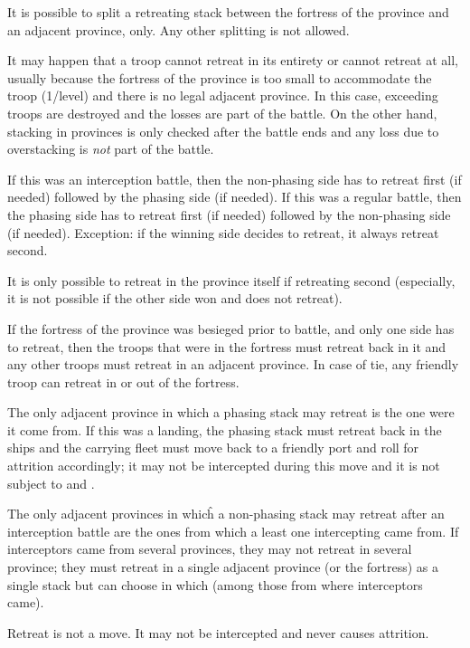 It is possible to split a retreating stack between the fortress of the
province and an adjacent province, only. Any other splitting is not allowed.

It may happen that a troop cannot retreat in its entirety or cannot retreat at
all, usually because the fortress of the province is too small to accommodate
the troop (1\LD/level) and there is no legal adjacent province. In this case,
exceeding troops are destroyed and the losses are part of the battle. On the
other hand, stacking in provinces is only checked after the battle ends and
any loss due to overstacking is \emph{not} part of the battle.

If this was an interception battle, then the non-phasing side has to retreat
first (if needed) followed by the phasing side (if needed). If this was a
regular battle, then the phasing side has to retreat first (if needed)
followed by the non-phasing side (if needed). Exception: if the winning side
decides to retreat, it always retreat second.

It is only possible to retreat in the province itself if retreating second
(especially, it is not possible if the other side won and does not retreat).

If the fortress of the province was besieged prior to battle, and only one
side has to retreat, then the troops that were in the fortress must retreat
back in it and any other troops must retreat in an adjacent province. In case
of tie, any friendly troop can retreat in or out of the fortress.

The only adjacent province in which a phasing stack may retreat is the one
were it come from. If this was a landing, the phasing stack must retreat back
in the ships and the carrying fleet must move back to a friendly port and roll
for attrition accordingly; it may not be intercepted during this move and it
is not subject to \Presidios and \StraitFort.

The only adjacent provinces in whicĥ a non-phasing stack may retreat after an
interception battle are the ones from which a least one intercepting \LDE came
from. If interceptors came from several provinces, they may not retreat in
several province; they must retreat in a single adjacent province (or the
fortress) as a single stack but can choose in which (among those from where
interceptors came).

Retreat is not a move. It may not be intercepted and never causes attrition.


